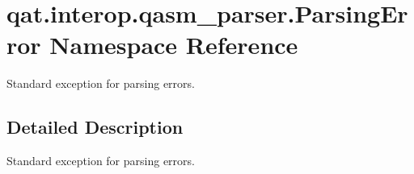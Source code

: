 \hypertarget{namespaceqat_1_1interop_1_1qasm__parser_1_1ParsingError}{\section{qat.\-interop.\-qasm\-\_\-parser.\-Parsing\-Error Namespace Reference}
\label{namespaceqat_1_1interop_1_1qasm__parser_1_1ParsingError}
}


Standard exception for parsing errors.  




\subsection{Detailed Description}
Standard exception for parsing errors. 